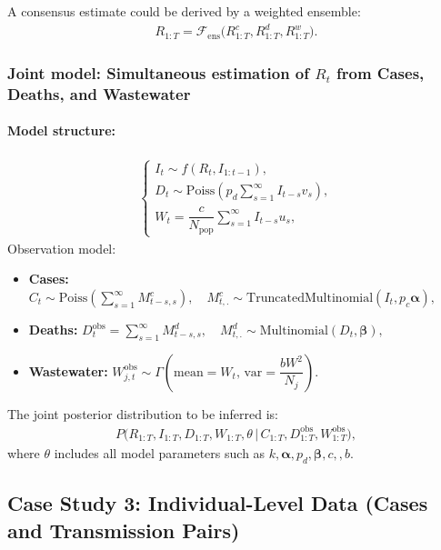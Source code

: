 \documentclass{article}
\begin{document}
A consensus estimate could be derived by a weighted ensemble:
\begin{align}
R_{1:T} = \mathcal{F}_{\mathrm{ens}}\big(R_{1:T}^c, R_{1:T}^d, R_{1:T}^w \big).
\end{align}

\subsubsection{Joint model: Simultaneous estimation of $R_t$ from Cases, Deaths, and Wastewater}

\paragraph{Model structure:}

\begin{align}
\begin{cases}
I_t \sim f(R_t, I_{1:t-1}), \\[6pt]
D_t \sim \mathrm{Poiss}\left(p_d \sum_{s=1}^\infty I_{t-s} v_s \right), \\[6pt]
W_t =\dfrac{c}{N_{\mathrm{pop}}} \sum_{s=1}^\infty I_{t-s} u_s,
\end{cases}
\end{align}
Observation model:
\begin{itemize}
    \item \textbf{Cases:} $C_t \sim \mathrm{Poiss}\left( \sum_{s=1}^\infty M^{c}_{t-s,s} \right), \quad M^{c}_{t,.} \sim \mathrm{TruncatedMultinomial}(I_t, p_c\boldsymbol{\alpha}),$
    \item \textbf{Deaths:} $D^{\text{obs}}_t = \sum_{s=1}^\infty M^{d}_{t-s,s}, \quad M^{d}_{t,.} \sim \mathrm{Multinomial}(D_t, \boldsymbol{\beta}),$
    \item \textbf{Wastewater:} $W^{\text{obs}}_{j,t} \sim \Gamma\left(\text{mean}= W_t,\,\text{var}=\dfrac{bW^2}{N_j}\right).$
\end{itemize}
The joint posterior distribution to be inferred is:
\begin{align}
P\big(R_{1:T}, I_{1:T}, D_{1:T}, W_{1:T}, \theta \,\big|\, C_{1:T}, D^{\text{obs}}_{1:T}, W^{\text{obs}}_{1:T}\big),
\end{align}
where $\theta$ includes all model parameters such as $k, \boldsymbol{\alpha},  p_d, \boldsymbol{\beta}, c,, b$.


\subsection{Case Study 3: Individual-Level Data (Cases and Transmission Pairs)}
\end{document}

